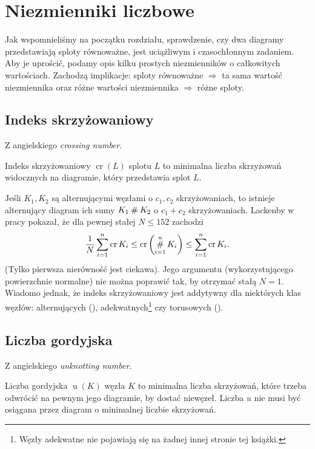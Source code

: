 \section{Niezmienniki liczbowe}
Jak wspomnieliśmy na początku rozdziału, sprawdzenie,
czy dwa diagramy przedstawiają sploty równoważne,
jest uciążliwym i czasochłonnym zadaniem.
Aby je uprościć, podamy opis kilku prostych niezmienników o całkowitych wartościach.
Zachodzą implikacje:
sploty równoważne $\Rightarrow$ ta sama wartość niezmiennika
oraz różne wartości niezmiennika $\Rightarrow$ różne sploty.

\subsection{Indeks skrzyżowaniowy} %
\label{sub:crossing_number}
Z angielskiego \emph{crossing number}.

\begin{definition}
    Indeks skrzyżowaniowy $\operatorname{cr}(L)$ splotu $L$ to
    minimalna liczba skrzyżowań widocznych na diagramie,
    który przedstawia splot $L$.
\end{definition}

Jeśli $K_1, K_2$ są alternującymi węzłami o $c_1, c_2$ skrzyżowaniach, to istnieje alternujący diagram ich sumy $K_1 \mathbin{\#} K_2$ o $c_1 + c_2$ skrzyżowaniach.
Lackenby w pracy \cite{lackenby09} pokazał, że dla pewnej stałej $N \le 152$ zachodzi
\[
    \frac 1 N \sum_{i=1}^n \operatorname{cr} K_i \le \operatorname{cr} \left(\operatorname*{\#}_{i=1}^n K_i\right) \le \sum_{i=1}^n \operatorname{cr} K_i.
\]
(Tylko pierwsza nierówność jest ciekawa).
Jego argumentu (wykorzystującego powierzchnie normalne) nie można poprawić tak, by otrzymać stałą $N = 1$.
Wiadomo jednak, że indeks skrzyżowaniowy jest addytywny dla niektórych klas węzłów: alternujących (\cite{kauffman88}), adekwatnych\footnote{Węzły adekwatne nie pojawiają się na żadnej innej stronie tej książki.} czy torusowych (\cite{gruber03}).


\subsection{Liczba gordyjska} %
\label{sub:unknotting_number}
Z angielskiego \emph{unknotting number}.

\begin{definition}
    Liczba gordyjska $\operatorname{u}(K)$ węzła $K$ to minimalna liczba skrzyżowań,
    które trzeba odwrócić na pewnym jego diagramie, by dostać niewęzeł.
    Liczba $u$ nie musi być osiągana przez diagram o minimalnej liczbie skrzyżowań.
\end{definition}

